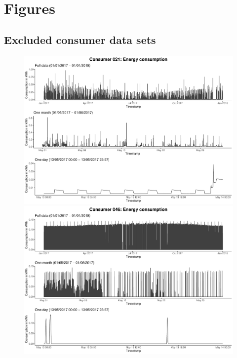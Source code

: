 
\section{Figures}\label{App:Figures}

\subsection{Excluded consumer data sets}\label{App:Figures:Excludedc}

\begin{centering}
\begin{figure}[!htbp]
        \includegraphics[width=\textwidth-0.85cm]{thesis/graphs/timeseries/c021_cons.pdf}\vspace{0.3cm}
        \includegraphics[width=\textwidth-0.85cm]{thesis/graphs/timeseries/c046_cons.pdf}

\end{figure}
\end{centering}

